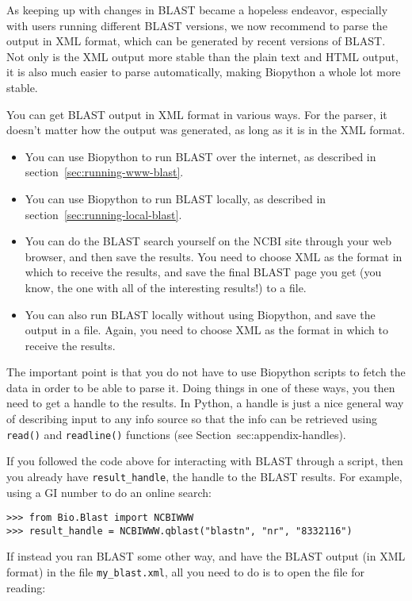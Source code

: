 \documentclass{report}
\begin{document}
As keeping up with changes in BLAST
became a hopeless endeavor, especially with users running different BLAST
versions, we now recommend to parse the output in XML format, which can be
generated by recent versions of BLAST. Not only is the XML output more stable
than the plain text and HTML output, it is also much easier to parse
automatically, making Biopython a whole lot more stable.

You can get BLAST output in XML format in various ways. For the parser, it
doesn't matter how the output was generated, as long as it is in the XML format.
\begin{itemize}
\item You can use Biopython to run BLAST over the internet, as described in
section~\ref{sec:running-www-blast}.
\item You can use Biopython to run BLAST locally, as described in
section~\ref{sec:running-local-blast}.
\item You can do the BLAST search yourself on the NCBI site through your
web browser, and then save the results. You need to choose XML as the format
in which to receive the results, and save the final BLAST page you get
(you know, the one with all of the interesting results!) to a file.
\item You can also run BLAST locally without using Biopython, and save
the output in a file. Again, you need to choose XML as the format in which
to receive the results.
\end{itemize}
The important point is that you do not have to use Biopython
scripts to fetch the data in order to be able to parse it.
Doing things in one of these ways, you then need to get a handle
to the results. In Python, a handle is just a nice general way of
describing input to any info source so that the info can be retrieved
using \verb|read()| and \verb|readline()| functions
(see Section~{sec:appendix-handles}).

If you followed the code above for interacting with BLAST through a
script, then you already have \verb|result_handle|, the handle to the
BLAST results.  For example, using a GI number to do an online search:

\begin{verbatim}
>>> from Bio.Blast import NCBIWWW
>>> result_handle = NCBIWWW.qblast("blastn", "nr", "8332116")
\end{verbatim}

If instead you ran BLAST some other way, and have the
BLAST output (in XML format) in the file \verb|my_blast.xml|, all you
need to do is to open the file for reading:
\end{document}
